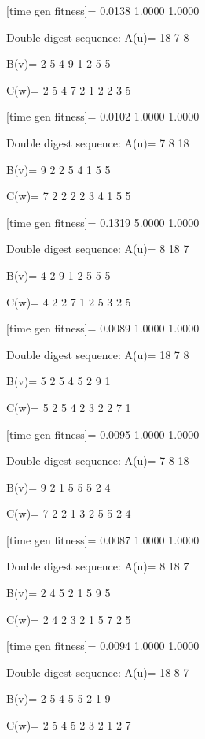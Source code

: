 [time gen fitness]=
    0.0138    1.0000    1.0000

Double digest sequence:
A(u)=
    18     7     8

B(v)=
     2     5     4     9     1     2     5     5

C(w)=
     2     5     4     7     2     1     2     2     3     5

[time gen fitness]=
    0.0102    1.0000    1.0000

Double digest sequence:
A(u)=
     7     8    18

B(v)=
     9     2     2     5     4     1     5     5

C(w)=
     7     2     2     2     2     3     4     1     5     5

[time gen fitness]=
    0.1319    5.0000    1.0000

Double digest sequence:
A(u)=
     8    18     7

B(v)=
     4     2     9     1     2     5     5     5

C(w)=
     4     2     2     7     1     2     5     3     2     5

[time gen fitness]=
    0.0089    1.0000    1.0000

Double digest sequence:
A(u)=
    18     7     8

B(v)=
     5     2     5     4     5     2     9     1

C(w)=
     5     2     5     4     2     3     2     2     7     1

[time gen fitness]=
    0.0095    1.0000    1.0000

Double digest sequence:
A(u)=
     7     8    18

B(v)=
     9     2     1     5     5     5     2     4

C(w)=
     7     2     2     1     3     2     5     5     2     4

[time gen fitness]=
    0.0087    1.0000    1.0000

Double digest sequence:
A(u)=
     8    18     7

B(v)=
     2     4     5     2     1     5     9     5

C(w)=
     2     4     2     3     2     1     5     7     2     5

[time gen fitness]=
    0.0094    1.0000    1.0000

Double digest sequence:
A(u)=
    18     8     7

B(v)=
     2     5     4     5     5     2     1     9

C(w)=
     2     5     4     5     2     3     2     1     2     7

